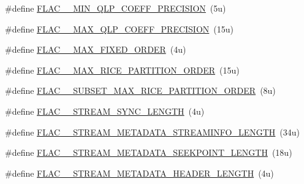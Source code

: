 \begin{DoxyCompactItemize}
\item 
\#define \mbox{\hyperlink{group__flac__format_gaf52033b2950b9396dd92b167b3bbe4db}{F\+L\+A\+C\+\_\+\+\_\+\+M\+I\+N\+\_\+\+Q\+L\+P\+\_\+\+C\+O\+E\+F\+F\+\_\+\+P\+R\+E\+C\+I\+S\+I\+ON}}~(5u)
\item 
\#define \mbox{\hyperlink{group__flac__format_ga6aa38a4bc5b9d96a78253ccb8b08bd1f}{F\+L\+A\+C\+\_\+\+\_\+\+M\+A\+X\+\_\+\+Q\+L\+P\+\_\+\+C\+O\+E\+F\+F\+\_\+\+P\+R\+E\+C\+I\+S\+I\+ON}}~(15u)
\item 
\#define \mbox{\hyperlink{group__flac__format_gabd0d5d6fe71b337244712b244ae7cb0f}{F\+L\+A\+C\+\_\+\+\_\+\+M\+A\+X\+\_\+\+F\+I\+X\+E\+D\+\_\+\+O\+R\+D\+ER}}~(4u)
\item 
\#define \mbox{\hyperlink{group__flac__format_ga78a2e97e230b2aa7f99edc94a466f5bb}{F\+L\+A\+C\+\_\+\+\_\+\+M\+A\+X\+\_\+\+R\+I\+C\+E\+\_\+\+P\+A\+R\+T\+I\+T\+I\+O\+N\+\_\+\+O\+R\+D\+ER}}~(15u)
\item 
\#define \mbox{\hyperlink{group__flac__format_gab19dec1b56de482ccfeb5f9843f60a14}{F\+L\+A\+C\+\_\+\+\_\+\+S\+U\+B\+S\+E\+T\+\_\+\+M\+A\+X\+\_\+\+R\+I\+C\+E\+\_\+\+P\+A\+R\+T\+I\+T\+I\+O\+N\+\_\+\+O\+R\+D\+ER}}~(8u)
\item 
\#define \mbox{\hyperlink{group__flac__format_gae7ddaf298d3ceb83aae6301908675c1d}{F\+L\+A\+C\+\_\+\+\_\+\+S\+T\+R\+E\+A\+M\+\_\+\+S\+Y\+N\+C\+\_\+\+L\+E\+N\+G\+TH}}~(4u)
\item 
\#define \mbox{\hyperlink{group__flac__format_ga06dfae7260da40e4c5f8fc4d531b326c}{F\+L\+A\+C\+\_\+\+\_\+\+S\+T\+R\+E\+A\+M\+\_\+\+M\+E\+T\+A\+D\+A\+T\+A\+\_\+\+S\+T\+R\+E\+A\+M\+I\+N\+F\+O\+\_\+\+L\+E\+N\+G\+TH}}~(34u)
\item 
\#define \mbox{\hyperlink{group__flac__format_gabdf85aa2c9a483378dfe850b85ab93ef}{F\+L\+A\+C\+\_\+\+\_\+\+S\+T\+R\+E\+A\+M\+\_\+\+M\+E\+T\+A\+D\+A\+T\+A\+\_\+\+S\+E\+E\+K\+P\+O\+I\+N\+T\+\_\+\+L\+E\+N\+G\+TH}}~(18u)
\item 
\#define \mbox{\hyperlink{group__flac__format_ga706a29b8a14902c457783bfd4fd7bab2}{F\+L\+A\+C\+\_\+\+\_\+\+S\+T\+R\+E\+A\+M\+\_\+\+M\+E\+T\+A\+D\+A\+T\+A\+\_\+\+H\+E\+A\+D\+E\+R\+\_\+\+L\+E\+N\+G\+TH}}~(4u)
\end{DoxyCompactItemize}
